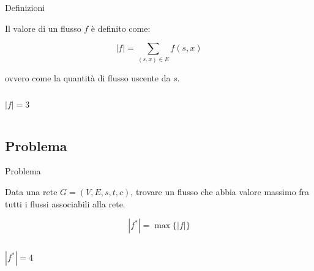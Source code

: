 \begin{frame}{Definizioni}

\vspace{-9pt}
\begin{myboxtitle}
Il \alert{valore di un flusso} $f$ è definito come:

\[
  |f| = \sum_{(s, x) \in E} f(s, x)
\]

ovvero come la quantità di flusso uscente da $s$.
\end{myboxtitle}

\begin{columns}[T]
\[|f| = 3\]
\vspace{-12pt}
\end{columns}

\end{frame}

\subsection{Problema}

\begin{frame}{Problema}

\vspace{-9pt}
\begin{myboxtitle}
Data una rete $G=(V,E,s,t,c)$, trovare un flusso che abbia valore massimo fra 
tutti i flussi associabili alla rete.

\[
  |f^*| = \max \{ |f| \}
\]
\end{myboxtitle}

\begin{columns}[T]
\[|f^*| = 4\]
\vspace{-12pt}
\end{columns}

\end{frame}

